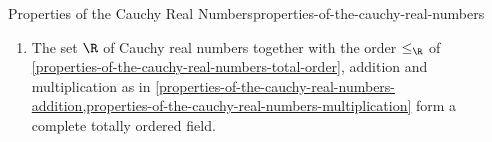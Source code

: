 \begin{proposition}{Properties of the Cauchy Real Numbers}{properties-of-the-cauchy-real-numbers}
\begin{enumerate}
            \begin{enumerate}
                \item\label{properties-of-the-cauchy-real-numbers-the-cauchy-real-numbers-admit-suprema-of-bounded-subsets-1}We have $S\neq\emptyset$.
                \item\label{properties-of-the-cauchy-real-numbers-the-cauchy-real-numbers-admit-suprema-of-bounded-subsets-2}The set $S$ is bounded above in that there exists some $a\in\R$ such that $s\leq a$ for all $s\in S$.
            \end{enumerate}
            are satisfied, then $S$ has a supremum in $\R$.
        \item\label{properties-of-the-cauchy-real-numbers-the-bourbaki-real-numbers-form-a-complete-totally-ordered-field}The set $\R$ of Cauchy real numbers together with the order $\leq_{\R}$ of \cref{properties-of-the-cauchy-real-numbers-total-order}, addition and multiplication as in \cref{properties-of-the-cauchy-real-numbers-addition,properties-of-the-cauchy-real-numbers-multiplication} form a complete totally ordered field.
    \end{enumerate}
\end{proposition}
